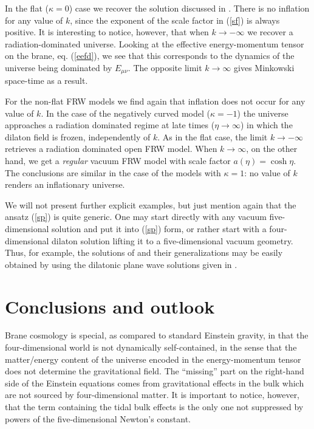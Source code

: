 \documentclass[prd,a4paper,twocolumn,superscriptaddress,nofootinbib,showpacs]{revtex4}
\begin{document}
In the flat ($\kappa=0$) case we recover the solution discussed in \cite{chsa}. 
There is no inflation for any value of 
$k$, since the exponent of the scale factor in (\ref{sf}) is always positive. It is interesting 
to notice, however, that when $k\rightarrow -\infty$ we recover a radiation-dominated universe. Looking at the 
effective energy-momentum tensor on the brane, eq. (\ref{eefd}), we see that this corresponds to the dynamics of the universe
being dominated by $E_{\mu\nu}$. The opposite limit $k\rightarrow \infty$ gives Minkowski space-time as a result.

For the non-flat FRW models we find again that inflation does not occur for any value of $k$. In the case of 
the negatively curved model ($\kappa=-1$) the universe approaches a radiation dominated regime at late times ($\eta\rightarrow \infty$)
in which the dilaton field is frozen, independently of $k$. As in the flat case, the limit $k\rightarrow-\infty$ retrieves
a radiation dominated open FRW model. When $k\rightarrow \infty$, on the other hand, we get a {\it regular} vacuum FRW model with
scale factor $a(\eta)=\cosh{\eta}$. The conclusions are similar in the case of the models with $\kappa=1$: no value of $k$ renders
an inflationary universe.

We will not  present  further explicit  examples, but just mention again that the ansatz 
(\ref{sp}) is quite generic. One may start directly with any vacuum five-dimensional solution and put
it into (\ref{sp}) form, or rather start with a four-dimensional dilaton solution lifting it to a 
five-dimensional 
vacuum geometry. Thus, for example, the solutions of \cite{hlz}  and their generalizations may be
easily obtained by using the dilatonic plane wave solutions given in \cite{fkvm}.



\section{Conclusions and outlook}

Brane cosmology is special, as compared to standard Einstein gravity, in that the four-dimensional world is not
dynamically self-contained, in the sense that the matter/energy content of the universe encoded in the 
energy-momentum 
tensor does not determine the gravitational field. The ``missing'' part on the right-hand side of the Einstein equations
comes from gravitational effects in the bulk which are not sourced by four-dimensional matter. It is important to notice, 
however, that the term containing the tidal bulk effects is the only one not suppressed by powers of the five-dimensional 
Newton's constant.  
\end{document}
